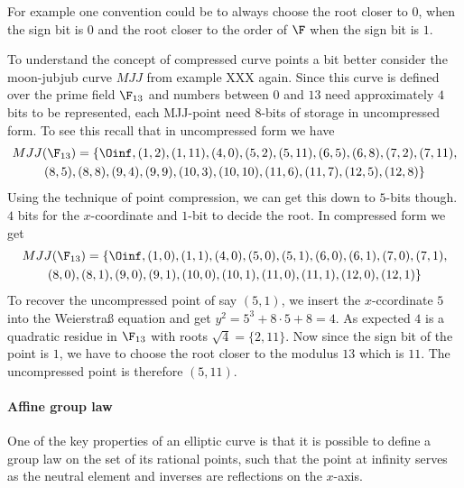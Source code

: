 For example one convention could be to always choose the root closer to $0$, when the sign bit is $0$ and the root closer to the order of $\F$ when the sign bit is $1$.

\begin{example} To understand the concept of compressed curve points a bit better consider the moon-jubjub curve $MJJ$ from example XXX again. Since this curve is defined over the prime field $\F_{13}$ and numbers between $0$ and $13$ need approximately $4$ bits to be represented, each MJJ-point need $8$-bits of storage in uncompressed form. To see this recall that in uncompressed form we have
\begin{multline*}
MJJ(\F_{13}) = \{\Oinf, (1, 2), (1, 11), (4, 0), (5, 2), (5, 11), (6, 5), (6, 8), (7,2), (7, 11), \\ (8, 5), (8, 8), (9, 4), (9, 9), (10, 3), (10,
10), (11, 6), (11, 7), (12, 5), (12, 8)\}
\end{multline*}
Using the technique of point compression, we can get this down to $5$-bits though. $4$ bits for the $x$-coordinate and $1$-bit to decide the root. In compressed form we get
\begin{multline*}
MJJ(\F_{13}) = \{\Oinf, (1, 0), (1, 1), (4, 0), (5, 0), (5, 1), (6, 0), (6, 1), (7,0), (7, 1), \\ (8, 0), (8, 1), (9, 0), (9, 1), (10, 0), (10,1), (11, 0), (11, 1), (12, 0), (12, 1)\}
\end{multline*} 
To recover the uncompressed point of say $(5,1)$, we insert the $x$-ccordinate $5$ into the Weierstraß equation and get $y^2 = 5^3 + 8\cdot 5 +8 = 4$. As expected $4$ is a quadratic residue in $\F_{13}$ with roots $\sqrt{4}= \{2,11\}$. Now since the sign bit of the point is $1$, we have to choose the root closer to the modulus $13$ which is $11$. The uncompressed point is therefore $(5,11)$. 
\end{example}
\paragraph{Affine group law}
One of the key properties of an elliptic curve is that it is possible to define a group law on the set of its rational points, such that the point at infinity serves as the neutral element and inverses are reflections on the $x$-axis.

